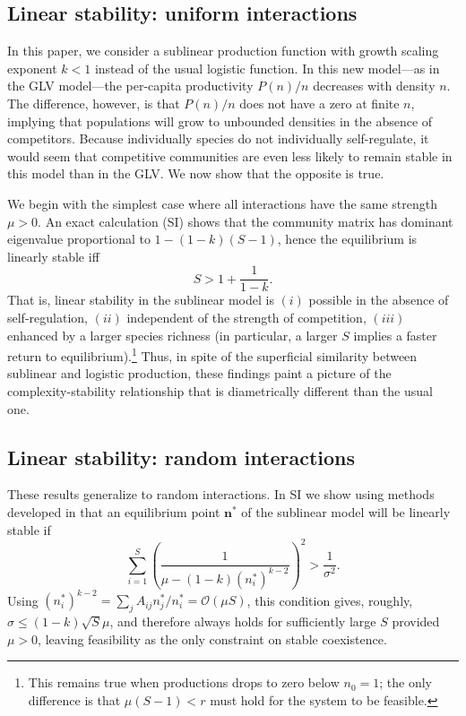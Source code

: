 \documentclass[12pt]{article}
\begin{document}
\subsection{Linear stability: uniform interactions}

In this paper, we consider a sublinear production function with growth scaling exponent $k < 1$ instead of the usual logistic function. In this new model---as in the GLV model---the per-capita productivity $P(n)/n$ decreases with density $n$. The difference, however, is that $P(n)/n$ does not have a zero at finite $n$, implying that populations will grow to unbounded densities in the absence of competitors. Because individually species do not individually self-regulate, it would seem that competitive communities are even less likely to remain stable in this model than in the GLV. We now show that the opposite is true. 

We begin with the simplest case where all interactions have the same strength $\mu >0 $. An exact calculation (SI) shows that the community matrix has dominant eigenvalue proportional to $1 - (1-k)(S-1)$, hence the equilibrium is linearly stable iff
\begin{equation}
    S > 1 + \frac{1}{1-k}.
\end{equation}
That is, linear stability in the sublinear model is $(i)$ possible in the absence of self-regulation, $(ii)$ independent of the strength of competition, $(iii)$ enhanced by a larger species richness (in particular, a larger $S$ implies a faster return to equilibrium).\footnote{This remains true when productions drops to zero below $n_0 = 1$; the only difference is that $\mu(S-1) < r$ must hold for the system to be feasible.} Thus, in spite of the superficial similarity between sublinear and logistic production, these findings paint a picture of the complexity-stability relationship that is diametrically different than the usual one. 

\subsection{Linear stability: random interactions}

These results generalize to random interactions. In SI we show using methods developed in \cite{ahmadian_properties_2015, stone_feasibility_2018} that an equilibrium point $\mathbf{n}^*$ of the sublinear model will be linearly stable if
\begin{equation}\label{stability-condition}
    \sum_{i=1}^S\left(\frac{1}{\mu - (1-k) (n_i^*)^{k-2}}\right)^2 > \frac{1}{\sigma^2}.
\end{equation}
Using $(n_i^*)^{k-2} = \sum_j A_{ij}n_j^*/n_i^*= \mathcal{O}(\mu S)$, this condition gives, roughly, $\sigma \leq (1-k)\sqrt{S}\mu$, and therefore always holds for sufficiently large $S$ provided $\mu > 0$, leaving feasibility as the only constraint on stable coexistence. 
\end{document}
